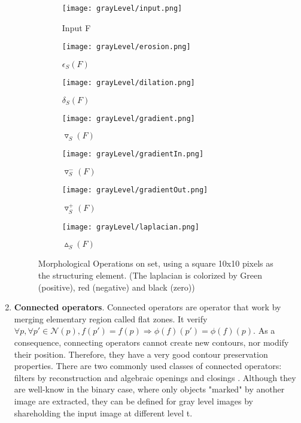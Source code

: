 \begin{enumerate}
\begin{figure}
	\begin{subfigure}{0.2\textwidth}
	 	\texttt{[image: grayLevel/input.png]} \caption{Input F}\label{fig:inputgrayLevel} \end{subfigure}
	\begin{subfigure}{0.2\textwidth}
	 	\texttt{[image: grayLevel/erosion.png]} \caption{$ \epsilon_S (F)$}\label{fig:erosiongrayLevel} \end{subfigure}
	\begin{subfigure}{0.2\textwidth}
		\texttt{[image: grayLevel/dilation.png]} \caption{$ \delta_S (F)$}\label{fig:dilationgrayLevel} \end{subfigure}
	\centering
		
	\begin{subfigure}{0.2\textwidth}
		\texttt{[image: grayLevel/gradient.png]} 
		\caption{$ \triangledown_S (F)$}\label{fig:gradientgrayLevel} \end{subfigure}
	\begin{subfigure}{0.2\textwidth}
		\texttt{[image: grayLevel/gradientIn.png]} 
		\caption{$ \triangledown_S ^- (F)$}\label{fig:gradientIngrayLevel} \end{subfigure}		
	\begin{subfigure}{0.2\textwidth}	
		\texttt{[image: grayLevel/gradientOut.png]} 
		\caption{$ \triangledown_S ^+ (F)$}\label{fig:gradientOutgrayLevel} \end{subfigure}
	\begin{subfigure}{0.2\textwidth}	
		\texttt{[image: grayLevel/laplacian.png]} 
		\caption{$\vartriangle_S (F)$}\label{fig:laplaciangrayLevel} \end{subfigure}					
	\centering
	\caption[Example of \textit{morphological operations}] {Morphological Operations on set, using a square 10x10 pixels as the structuring element. (The laplacian is colorized by Green (positive), red (negative) and black (zero)) }
	\label{fig:grayLevelOperations}
\end{figure}


\item \textbf{Connected operators}. Connected operators \cite{Salembier95flatzones} are operator that work by merging elementary region called flat zones. It verify 
$ \forall p, \forall p' \in \mathcal{N}(p), f(p')=f(p) \Longrightarrow  \phi(f)(p')=\phi(f)(p)$. As a consequence, connecting operators cannot create new contours, nor modify their position. Therefore, they have a very good contour preservation properties. There are two commonly used classes of connected operators: filters by reconstruction and algebraic openings and closings \cite{Vincent.1993.tip}. Although they are well-know in the binary case, where only objects "marked" by another image are extracted, they can be defined for gray level images by shareholding the input image at different level t.  
\end{enumerate}
